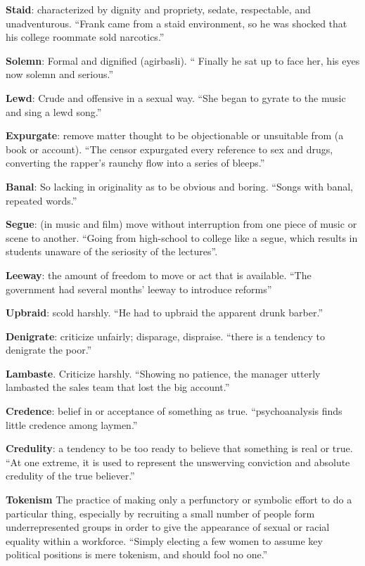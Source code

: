 \documentclass[12pt, a4paper]{ximera}
\begin{document}
\textbf{Staid}: characterized by dignity and propriety, sedate, respectable, and unadventurous. ``Frank came from a staid environment, so he was shocked that his college roommate sold narcotics.''

\textbf{Solemn}: Formal and dignified (agirbasli). `` Finally he sat up to face her, his eyes now solemn and serious.''

\textbf{Lewd}: Crude and offensive in a sexual way. ``She began to gyrate to the music and sing a lewd song.''

\textbf{Expurgate}: remove matter thought to be objectionable or unsuitable from (a book or account). ``The censor expurgated every reference to sex and drugs, converting the rapper's raunchy flow into a series of bleeps.''

\textbf{Banal}: So lacking in originality as to be obvious and boring. ``Songs with banal, repeated words.''

\textbf{Segue}: (in music and film) move without interruption from one piece of music or scene to another. ``Going from high-school to college like a segue, which results in students unaware of the seriosity of the lectures''.

\textbf{Leeway}: the amount of freedom to move or act that is available. ``The government had several months' leeway to introduce reforms''

\textbf{Upbraid}: scold harshly. ``He had to upbraid the apparent drunk barber.''

\textbf{Denigrate}: criticize unfairly; disparage, dispraise. ``there is a tendency to denigrate the poor.''

\textbf{Lambaste}. Criticize harshly. ``Showing no patience, the manager utterly lambasted the sales team that lost the big account.''

\textbf{Credence}: belief in or acceptance of something as true. ``psychoanalysis finds little credence among laymen.''

\textbf{Credulity}: a tendency to be too ready to believe that something is real or true. ``At one extreme, it is used to represent the unswerving conviction and absolute credulity of the true believer.''

\textbf{Tokenism} The practice of making only a perfunctory or symbolic effort to do a particular thing, especially by recruiting a small number of people form underrepresented groups in order to give the appearance of sexual or racial equality within a workforce. ``Simply electing a few women to assume key political positions is mere tokenism, and should fool no one.''
\end{document}
